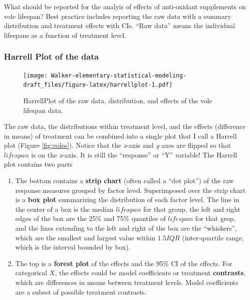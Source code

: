 \documentclass[]{book}
\providecommand{\tightlist}{%
  \setlength{\itemsep}{0pt}\setlength{\parskip}{0pt}}
\begin{document}
What should be reported for the analyis of effects of anti-oxidant supplements on vole lifespan? Best practice includes reporting the raw data with a summary distribution and treatment effects with CIs. ``Raw data'' means the individual lifespans as a function of treatment level.

\hypertarget{harrell-plot-of-the-data}{%
\subsubsection{Harrell Plot of the data}\label{harrell-plot-of-the-data}}

\begin{figure}
\centering
\texttt{[image: Walker-elementary-statistical-modeling-draft\_files/figure-latex/harrellplot-1.pdf]}
\caption{\label{fig:harrellplot}HarrellPlot of the raw data, distribution, and effects of the vole lifespan data.}
\end{figure}

The raw data, the distributions within treatment level, and the effects (difference in means) of treatment can be combined into a single plot that I call a Harrell plot (Figure \ref{fig:voles}). Notice that the \emph{x}-axis and \emph{y} axes are flipped so that \(lifespan\) is on the \emph{x}-axis. It is still the ``response'' or ``Y'' variable! The Harrell plot contains two parts

\begin{enumerate}
\def\labelenumi{\arabic{enumi}.}
\tightlist
\item
  The bottom contains a \textbf{strip chart} (often called a ``dot plot'') of the raw response measures grouped by factor level. Superimposed over the strip chart is a \textbf{box plot} summarizing the distribution of each factor level. The line in the center of a box is the median \(lifespan\) for that group, the left and right edges of the box are the 25\% and 75\% quantiles of \(lifespan\) for that grop, and the lines extending to the left and right of the box are the ``whiskers'', which are the smallest and largest value within \(1.5 IQR\) (inter-quartile range, which is the interval bounded by box).
\item
  The top is a \textbf{forest plot} of the effects and the 95\% CI of the effects. For categorical \(X\), the effects could be model coefficients or treatment \textbf{contrasts}, which are differences in means between treatment levels. Model coefficients are a subset of possible treatment contrasts.
\end{enumerate}
\end{document}
